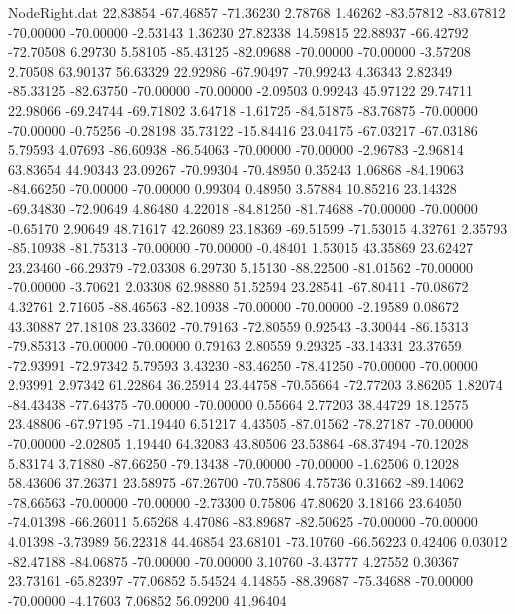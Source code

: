 \begin{filecontents}{NodeRight.dat}
  22.83854  -67.46857  -71.36230     2.78768    1.46262  -83.57812  -83.67812  -70.00000  -70.00000   -2.53143    1.36230   27.82338   14.59815
  22.88937  -66.42792  -72.70508     6.29730    5.58105  -85.43125  -82.09688  -70.00000  -70.00000   -3.57208    2.70508   63.90137   56.63329
  22.92986  -67.90497  -70.99243     4.36343    2.82349  -85.33125  -82.63750  -70.00000  -70.00000   -2.09503    0.99243   45.97122   29.74711
  22.98066  -69.24744  -69.71802     3.64718   -1.61725  -84.51875  -83.76875  -70.00000  -70.00000   -0.75256   -0.28198   35.73122  -15.84416
  23.04175  -67.03217  -67.03186     5.79593    4.07693  -86.60938  -86.54063  -70.00000  -70.00000   -2.96783   -2.96814   63.83654   44.90343
  23.09267  -70.99304  -70.48950     0.35243    1.06868  -84.19063  -84.66250  -70.00000  -70.00000    0.99304    0.48950    3.57884   10.85216
  23.14328  -69.34830  -72.90649     4.86480    4.22018  -84.81250  -81.74688  -70.00000  -70.00000   -0.65170    2.90649   48.71617   42.26089
  23.18369  -69.51599  -71.53015     4.32761    2.35793  -85.10938  -81.75313  -70.00000  -70.00000   -0.48401    1.53015   43.35869   23.62427
  23.23460  -66.29379  -72.03308     6.29730    5.15130  -88.22500  -81.01562  -70.00000  -70.00000   -3.70621    2.03308   62.98880   51.52594
  23.28541  -67.80411  -70.08672     4.32761    2.71605  -88.46563  -82.10938  -70.00000  -70.00000   -2.19589    0.08672   43.30887   27.18108
  23.33602  -70.79163  -72.80559     0.92543   -3.30044  -86.15313  -79.85313  -70.00000  -70.00000    0.79163    2.80559    9.29325  -33.14331
  23.37659  -72.93991  -72.97342     5.79593    3.43230  -83.46250  -78.41250  -70.00000  -70.00000    2.93991    2.97342   61.22864   36.25914
  23.44758  -70.55664  -72.77203     3.86205    1.82074  -84.43438  -77.64375  -70.00000  -70.00000    0.55664    2.77203   38.44729   18.12575
  23.48806  -67.97195  -71.19440     6.51217    4.43505  -87.01562  -78.27187  -70.00000  -70.00000   -2.02805    1.19440   64.32083   43.80506
  23.53864  -68.37494  -70.12028     5.83174    3.71880  -87.66250  -79.13438  -70.00000  -70.00000   -1.62506    0.12028   58.43606   37.26371
  23.58975  -67.26700  -70.75806     4.75736    0.31662  -89.14062  -78.66563  -70.00000  -70.00000   -2.73300    0.75806   47.80620    3.18166
  23.64050  -74.01398  -66.26011     5.65268    4.47086  -83.89687  -82.50625  -70.00000  -70.00000    4.01398   -3.73989   56.22318   44.46854
  23.68101  -73.10760  -66.56223     0.42406    0.03012  -82.47188  -84.06875  -70.00000  -70.00000    3.10760   -3.43777    4.27552    0.30367
  23.73161  -65.82397  -77.06852     5.54524    4.14855  -88.39687  -75.34688  -70.00000  -70.00000   -4.17603    7.06852   56.09200   41.96404

\end{filecontents}
